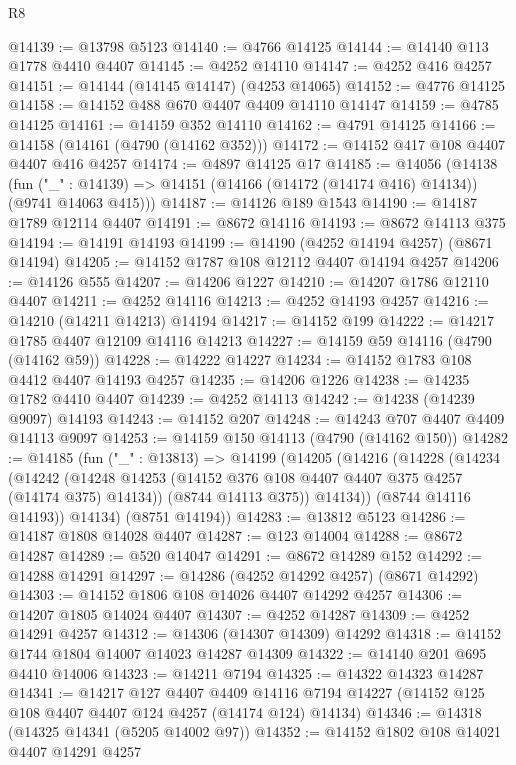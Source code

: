 \begin{lexlean}{R8}
\begin{coremodule}
@14139 := @13798 @5123
@14140 := @4766 @14125
@14144 := @14140 @113 @1778 @4410 @4407
@14145 := @4252 @14110
@14147 := @4252 @416 @4257
@14151 := @14144 (@14145 @14147) (@4253 @14065)
@14152 := @4776 @14125
@14158 := @14152 @488 @670 @4407 @4409 @14110 @14147
@14159 := @4785 @14125
@14161 := @14159 @352 @14110
@14162 := @4791 @14125
@14166 := @14158 (@14161 (@4790 (@14162 @352)))
@14172 := @14152 @417 @108 @4407 @4407 @416 @4257
@14174 := @4897 @14125 @17
@14185 := @14056
    (@14138
      (fun ("_" : @14139) => @14151 (@14166 (@14172 (@14174 @416) @14134)) (@9741 @14063 @415)))
@14187 := @14126 @189 @1543
@14190 := @14187 @1789 @12114 @4407
@14191 := @8672 @14116
@14193 := @8672 @14113 @375
@14194 := @14191 @14193
@14199 := @14190 (@4252 @14194 @4257) (@8671 @14194)
@14205 := @14152 @1787 @108 @12112 @4407 @14194 @4257
@14206 := @14126 @555
@14207 := @14206 @1227
@14210 := @14207 @1786 @12110 @4407
@14211 := @4252 @14116
@14213 := @4252 @14193 @4257
@14216 := @14210 (@14211 @14213) @14194
@14217 := @14152 @199
@14222 := @14217 @1785 @4407 @12109 @14116 @14213
@14227 := @14159 @59 @14116 (@4790 (@14162 @59))
@14228 := @14222 @14227
@14234 := @14152 @1783 @108 @4412 @4407 @14193 @4257
@14235 := @14206 @1226
@14238 := @14235 @1782 @4410 @4407
@14239 := @4252 @14113
@14242 := @14238 (@14239 @9097) @14193
@14243 := @14152 @207
@14248 := @14243 @707 @4407 @4409 @14113 @9097
@14253 := @14159 @150 @14113 (@4790 (@14162 @150))
@14282 := @14185
    (fun ("_" : @13813) =>
    @14199
      (@14205
        (@14216
          (@14228
            (@14234
              (@14242
                (@14248 @14253 (@14152 @376 @108 @4407 @4407 @375 @4257 (@14174 @375) @14134))
                (@8744 @14113 @375))
              @14134))
          (@8744 @14116 @14193))
        @14134)
      (@8751 @14194))
@14283 := @13812 @5123
@14286 := @14187 @1808 @14028 @4407
@14287 := @123 @14004
@14288 := @8672 @14287
@14289 := @520 @14047
@14291 := @8672 @14289 @152
@14292 := @14288 @14291
@14297 := @14286 (@4252 @14292 @4257) (@8671 @14292)
@14303 := @14152 @1806 @108 @14026 @4407 @14292 @4257
@14306 := @14207 @1805 @14024 @4407
@14307 := @4252 @14287
@14309 := @4252 @14291 @4257
@14312 := @14306 (@14307 @14309) @14292
@14318 := @14152 @1744 @1804 @14007 @14023 @14287 @14309
@14322 := @14140 @201 @695 @4410 @14006
@14323 := @14211 @7194
@14325 := @14322 @14323 @14287
@14341 := @14217
    @127
    @4407
    @4409
    @14116
    @7194
    @14227
    (@14152 @125 @108 @4407 @4407 @124 @4257 (@14174 @124) @14134)
@14346 := @14318 (@14325 @14341 (@5205 @14002 @97))
@14352 := @14152 @1802 @108 @14021 @4407 @14291 @4257

\end{coremodule}
\end{lexlean}
